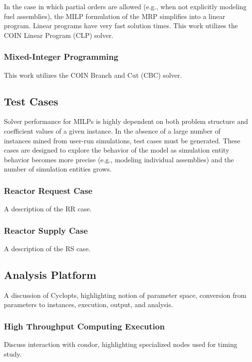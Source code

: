 In the case in which partial orders are allowed (e.g., when not explicitly
modeling fuel assemblies), the MILP formulation of the MRP simplifies into a
linear program. Linear programs have very fast solution times. This work
utilizes the COIN Linear Program (CLP) solver.

\subsubsection{Mixed-Integer Programming}

This work utilizes the COIN Branch and Cut (CBC) solver. 

\subsection{Test Cases}

Solver performance for MILPs is highly dependent on both problem structure and
coefficient values of a given instance. In the absence of a large number of
instances mined from user-run simulations, test cases must be generated. These
cases are designed to explore the behavior of the model as simulation entity
behavior becomes more precise (e.g., modeling individual assemblies) and the
number of simulation entities grows.

\subsubsection{Reactor Request Case}

A description of the RR case.

\subsubsection{Reactor Supply Case}

A description of the RS case.

\subsection{Analysis Platform}

A discussion of Cyclopts, highlighting notion of parameter space, conversion
from parameters to instances, execution, output, and analysis. 

\subsubsection{High Throughput Computing Execution}

Discuss interaction with condor, highlighting specialized nodes used for timing study.

